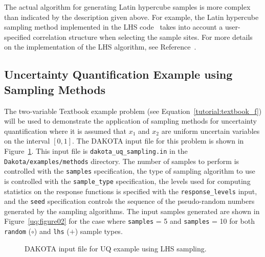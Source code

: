 The actual algorithm for generating Latin hypercube samples is more
complex than indicated by the description given above. For example,
the Latin hypercube sampling method implemented in the LHS
code~\cite{Swi04} takes into account a user-specified correlation
structure when selecting the sample sites. For more details on the
implementation of the LHS algorithm, see Reference~\cite{Swi04}.

\subsection{Uncertainty Quantification Example using Sampling Methods}\label{uq:uncertainty1}

The two-variable Textbook example problem (see
Equation~\ref{tutorial:textbook_f}) will be used to demonstrate
the application of sampling methods for uncertainty quantification
where it is assumed that $x_1$ and $x_2$ are uniform uncertain
variables on the interval $[0,1]$. The DAKOTA input file for this
problem is shown in Figure~\ref{uq:figure01}. This input 
file is \texttt{dakota\_uq\_sampling.in} in the 
\texttt{Dakota/examples/methods} directory.  The number of samples to
perform is controlled with the \texttt{samples} specification, the
type of sampling algorithm to use is controlled with the
\texttt{sample\_type} specification, the levels used for computing
statistics on the response functions is specified with the
\texttt{response\_levels} input, and the \texttt{seed} specification
controls the sequence of the pseudo-random numbers generated by the
sampling algorithms. The input samples generated are shown in
Figure~\ref{uq:figure02} for the case where \texttt{samples} = 5 and
\texttt{samples} = 10 for both \texttt{random} ($\circ$) and 
\texttt{lhs} ($+$) sample types.

\begin{figure}
  \centering \begin{bigbox} \begin{small}
   \end{small} \end{bigbox}
\caption{DAKOTA input file for UQ example using LHS sampling.}
\label{uq:figure01}
\end{figure}

